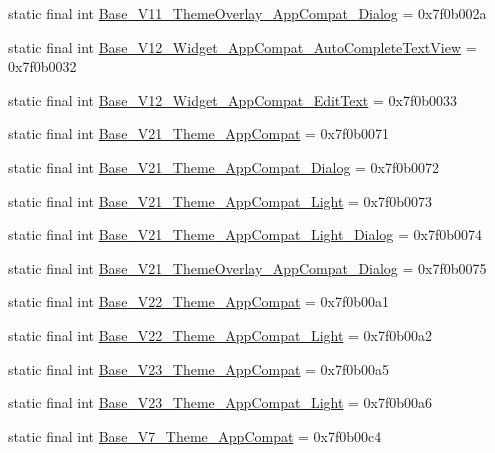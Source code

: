 \begin{CompactItemize}
\item 
static final int \hyperlink{classandroid_1_1support_1_1v4_1_1_r_1_1style_9a53ac089f6f6e415823bbe1780e0d98}{Base\_\-V11\_\-ThemeOverlay\_\-AppCompat\_\-Dialog} = 0x7f0b002a
\item 
static final int \hyperlink{classandroid_1_1support_1_1v4_1_1_r_1_1style_329617ed2abee2342b55334e80a50a0d}{Base\_\-V12\_\-Widget\_\-AppCompat\_\-AutoCompleteTextView} = 0x7f0b0032
\item 
static final int \hyperlink{classandroid_1_1support_1_1v4_1_1_r_1_1style_76f5bbddd9d444399c7e9ba7187133bc}{Base\_\-V12\_\-Widget\_\-AppCompat\_\-EditText} = 0x7f0b0033
\item 
static final int \hyperlink{classandroid_1_1support_1_1v4_1_1_r_1_1style_b7c699084fa5e030e36cd4e783069f9b}{Base\_\-V21\_\-Theme\_\-AppCompat} = 0x7f0b0071
\item 
static final int \hyperlink{classandroid_1_1support_1_1v4_1_1_r_1_1style_907b3b5d1b9c70de70e98d7623341943}{Base\_\-V21\_\-Theme\_\-AppCompat\_\-Dialog} = 0x7f0b0072
\item 
static final int \hyperlink{classandroid_1_1support_1_1v4_1_1_r_1_1style_b655a5e7bcf1b86314591652d1600111}{Base\_\-V21\_\-Theme\_\-AppCompat\_\-Light} = 0x7f0b0073
\item 
static final int \hyperlink{classandroid_1_1support_1_1v4_1_1_r_1_1style_da130b1e73daf3ab6bfcb8714bc570af}{Base\_\-V21\_\-Theme\_\-AppCompat\_\-Light\_\-Dialog} = 0x7f0b0074
\item 
static final int \hyperlink{classandroid_1_1support_1_1v4_1_1_r_1_1style_62809d93c32f9e517e4261f261c6d414}{Base\_\-V21\_\-ThemeOverlay\_\-AppCompat\_\-Dialog} = 0x7f0b0075
\item 
static final int \hyperlink{classandroid_1_1support_1_1v4_1_1_r_1_1style_fb2435c6602ee0bfa9d1119ab0935206}{Base\_\-V22\_\-Theme\_\-AppCompat} = 0x7f0b00a1
\item 
static final int \hyperlink{classandroid_1_1support_1_1v4_1_1_r_1_1style_43167d2b6eef254ca70b3546cd2fc1db}{Base\_\-V22\_\-Theme\_\-AppCompat\_\-Light} = 0x7f0b00a2
\item 
static final int \hyperlink{classandroid_1_1support_1_1v4_1_1_r_1_1style_83cdaebd91ea3d989bc47297819e3e16}{Base\_\-V23\_\-Theme\_\-AppCompat} = 0x7f0b00a5
\item 
static final int \hyperlink{classandroid_1_1support_1_1v4_1_1_r_1_1style_b44926c5632c73cc80db2728845c5402}{Base\_\-V23\_\-Theme\_\-AppCompat\_\-Light} = 0x7f0b00a6
\item 
static final int \hyperlink{classandroid_1_1support_1_1v4_1_1_r_1_1style_acbe204b6ddaeece9893924b0ae55a88}{Base\_\-V7\_\-Theme\_\-AppCompat} = 0x7f0b00c4

\end{CompactItemize}
